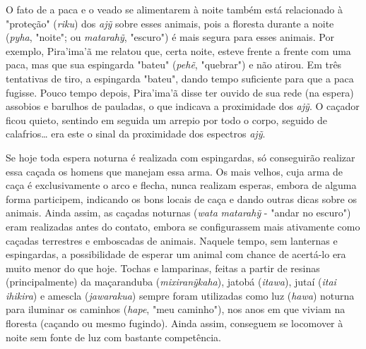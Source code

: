 O fato de a paca e o veado se alimentarem à noite também está
relacionado à "proteção" (\emph{riku}) dos \emph{ajỹ} sobre esses
animais, pois a floresta durante a noite (\emph{pyha}, "noite"; ou
\emph{matarahỹ}, "escuro") é mais segura para esses animais. Por
exemplo, Pira'ima'ã me relatou que, certa noite, esteve frente a frente
com uma paca, mas que sua espingarda "bateu" (\emph{pehẽ}, "quebrar") e
não atirou. Em três tentativas de tiro, a espingarda "bateu", dando
tempo suficiente para que a paca fugisse. Pouco tempo depois, Pira'ima'ã
disse ter ouvido de sua rede (na espera) assobios e barulhos de
pauladas, o que indicava a proximidade dos \emph{ajỹ}. O caçador ficou
quieto, sentindo em seguida um arrepio por todo o corpo, seguido de
calafrios\ldots{} era este o sinal da proximidade dos espectros \emph{ajỹ}.

Se hoje toda espera noturna é realizada com espingardas, só conseguirão
realizar essa caçada os homens que manejam essa arma. Os mais velhos,
cuja arma de caça é exclusivamente o arco e flecha, nunca realizam
esperas, embora de alguma forma participem, indicando os bons locais de
caça e dando outras dicas sobre os animais. Ainda assim, as caçadas
noturnas (\emph{wata} \emph{matarahỹ} - "andar no escuro") eram
realizadas antes do contato, embora se configurassem mais ativamente
como caçadas terrestres e emboscadas de animais. Naquele tempo, sem
lanternas e espingardas, a possibilidade de esperar um animal com chance
de acertá-lo era muito menor do que hoje. Tochas e lamparinas, feitas a
partir de resinas (principalmente) da maçaranduba (\emph{mixiranỹkaha}),
jatobá (\emph{itawa}), jutaí (\emph{itai ihikira}) e amescla
(\emph{jawarakua}) sempre foram utilizadas como luz (\emph{hawa})
noturna para iluminar os caminhos (\emph{hape}, "meu caminho"), nos anos
em que viviam na floresta (caçando ou mesmo fugindo). Ainda assim,
conseguem se locomover à noite sem fonte de luz com bastante
competência.

